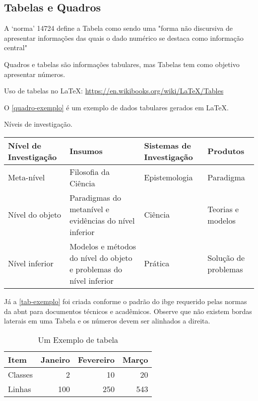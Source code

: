 \subsection{Tabelas e Quadros}
A ‘norma’ 14724 \cite[3.32]{NBR14724:2011} define a Tabela como sendo uma "forma não discursiva de apresentar informações das quais o dado numérico se destaca como informação central" 

Quadros e tabelas são informações tabulares, mas Tabelas tem como objetivo apresentar números.

Uso de tabelas no \LaTeX : \url{https://en.wikibooks.org/wiki/LaTeX/Tables}


O \autoref{quadro-exemplo} é um exemplo de dados tabulares gerados em 
\LaTeX.

\begin{quadro}[htb]
\centering
\ABNTEXfontereduzida
\caption[Níveis de investigação]{Níveis de investigação.}
\label{quadro-exemplo}
\begin{tabular}{|p{2.6cm}|p{6.0cm}|p{2.25cm}|p{3.40cm}|}
  \hline
   \textbf{Nível de Investigação} & \textbf{Insumos}  & \textbf{Sistemas de Investigação}  & \textbf{Produtos}  \\
    \hline
    Meta-nível & Filosofia\index{filosofia} da Ciência  & Epistemologia &
    Paradigma  \\
    \hline
    Nível do objeto & Paradigmas do metanível e evidências do nível inferior &
    Ciência  & Teorias e modelos \\
    \hline
    Nível inferior & Modelos e métodos do nível do objeto e problemas do nível inferior & Prática & Solução de problemas  \\
   \hline
\end{tabular}
\end{quadro}



Já a \autoref{tab-exemplo} foi criada conforme o padrão do \ac{ibge}
requerido pelas normas da \ac{abnt} para documentos técnicos e acadêmicos. Observe que não existem bordas laterais em uma Tabela e os números devem ser alinhados a direita.

\begin{table}[htb]
\centering
\caption{Um Exemplo de tabela}
\label{tab-exemplo}
\begin{tabular}{p{2.6cm}|r|r|r}
    \hline
   \textbf{Item} & \textbf{Janeiro}  & \textbf{Fevereiro}  & \textbf{Março}  \\
    \hline
    Classes & 2  & 10 & 20  \\
    \hline
    Linhas & 100  & 250 & 543 \\
    \hline
\end{tabular}
\end{table}

